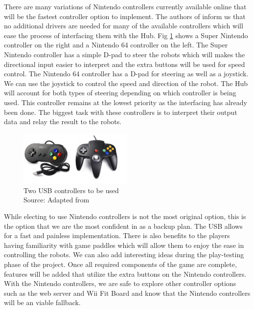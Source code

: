 \documentclass[11pt]{ieeeconf}
\begin{document}
There are many variations of Nintendo controllers currently available online that will be the fastest controller option to implement. The authors of \cite{controller:19} inform us that no additional drivers are needed for many of the available controllers which will ease the process of interfacing them with the Hub. Fig \ref{Controllers} shows a Super Nintendo controller on the right and a Nintendo 64 controller on the left. The Super Nintendo controller has a simple D-pad to steer the robots which will makes the directional input easier to interpret and the extra buttons will be used for speed control. The Nintendo 64 controller has a D-pad for steering as well as a joystick. We can use the joystick to control the speed and direction of the robot. The Hub will account for both types of steering depending on which controller is being used. This controller remains at the lowest priority as the interfacing has already been done. The biggest task with these controllers is to interpret their output data and relay the result to the robots.

\begin{figure}[H]
\centering
\captionsetup{justification=centering}
\includegraphics[width=0.5\textwidth]{images/controllers.png}
\caption{Two USB controllers to be used \\ Source: Adapted from \cite{controller:19}}
\label{Controllers}
\end{figure}

While electing to use Nintendo controllers is not the most original option, this is the option that we are the most confident in as a backup plan. The USB allows for a fast and painless implementation. There is also benefits to the players having familiarity with game paddles which will allow them to enjoy the ease in controlling the robots. We can also add interesting ideas during the play-testing phase of the project. Once all required components of the game are complete, features will be added that utilize the extra buttons on the Nintendo controllers. With the Nintendo controllers, we are safe to explore other controller options such as the web server and Wii Fit Board and know that the Nintendo controllers will be an viable fallback. 
\end{document}
